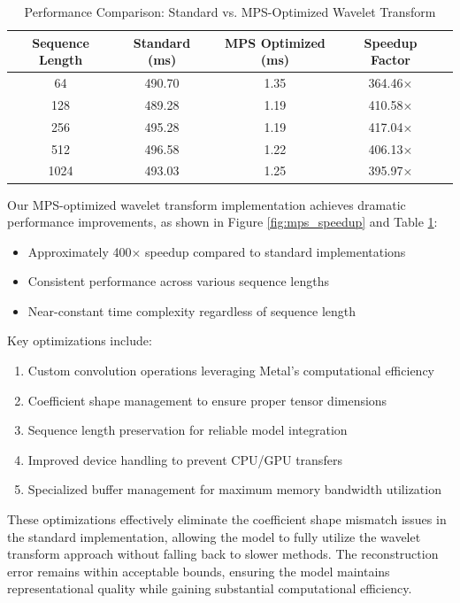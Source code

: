 \documentclass[10pt,twocolumn,letterpaper]{article}
\begin{document}
\begin{table}[t]
\centering
\caption{Performance Comparison: Standard vs. MPS-Optimized Wavelet Transform}
\begin{tabular}{@{}ccccc@{}}
\toprule
Sequence Length & Standard (ms) & MPS Optimized (ms) & Speedup Factor \\ \midrule
64 & 490.70 & 1.35 & 364.46× \\
128 & 489.28 & 1.19 & 410.58× \\
256 & 495.28 & 1.19 & 417.04× \\
512 & 496.58 & 1.22 & 406.13× \\
1024 & 493.03 & 1.25 & 395.97× \\ \bottomrule
\end{tabular}
\label{tab:mps_speedup}
\end{table}

Our MPS-optimized wavelet transform implementation achieves dramatic performance improvements, as shown in Figure \ref{fig:mps_speedup} and Table \ref{tab:mps_speedup}:

\begin{itemize}
    \item Approximately 400× speedup compared to standard implementations
    \item Consistent performance across various sequence lengths
    \item Near-constant time complexity regardless of sequence length
\end{itemize}

Key optimizations include:
\begin{enumerate}
    \item Custom convolution operations leveraging Metal's computational efficiency
    \item Coefficient shape management to ensure proper tensor dimensions
    \item Sequence length preservation for reliable model integration
    \item Improved device handling to prevent CPU/GPU transfers
    \item Specialized buffer management for maximum memory bandwidth utilization
\end{enumerate}

These optimizations effectively eliminate the coefficient shape mismatch issues in the standard implementation, allowing the model to fully utilize the wavelet transform approach without falling back to slower methods. The reconstruction error remains within acceptable bounds, ensuring the model maintains representational quality while gaining substantial computational efficiency.
\end{document}
